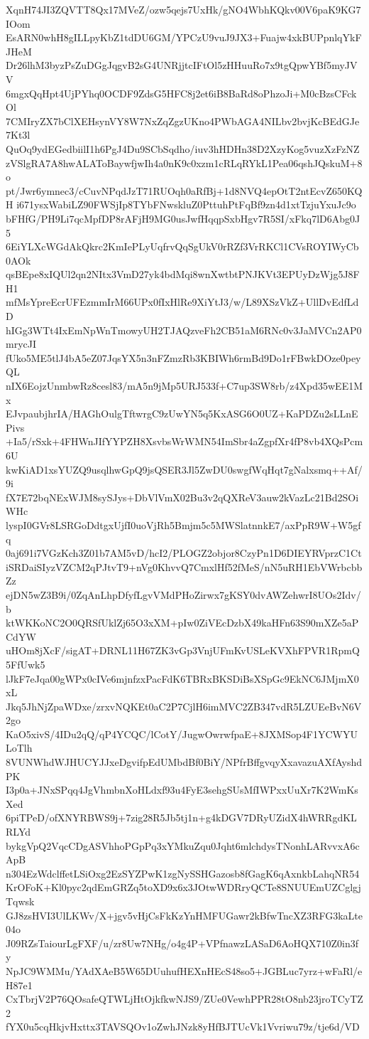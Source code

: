 XqnH74JI3ZQVTT8Qx17MVeZ/ozw5qejs7UxHk/gNO4WbhKQkv00V6paK9KG7IOom
EsARN0whH8gILLpyKbZ1tdDU6GM/YPCzU9vuJ9JX3+Fuajw4xkBUPpnlqYkFJHeM
Dr26lhM3byzPsZuDGgJqgvB2sG4UNRjjtcIFtOl5zHHuuRo7x9tgQpwYBf5myJVV
6mgxQqHpt4UjPYhq0OCDF9ZdsG5HFC8j2et6iB8BaRd8oPhzoJi+M0cBzsCFckOl
7CMIryZX7bClXEHsynVY8W7NxZqZgzUKno4PWbAGA4NILbv2bvjKcBEdGJe7Kt3l
QuOq9ydEGedbiilI1h6PgJ4Du9SCbSqdho/iuv3hHDHn38D2XzyKog5vuzXzFzNZ
zVSlgRA7A8hwALAToBaywfjwIh4a0nK9c0xzm1cRLqRYkL1Pea06qshJQskuM+8o
pt/Jwr6ymnec3/cCuvNPqdJzT71RUOqh0aRfBj+1d8NVQ4epOtT2ntEcvZ650KQH
i671ysxWabiLZ90FWSjIp8TYbFNwskluZ0PttuhPtFqBf9zn4d1xtTzjuYxuJc9o
bFHfG/PH9Li7qcMpfDP8rAFjH9MG0usJwfHqqpSxbHgv7R5SI/xFkq7lD6Abg0J5
6EiYLXcWGdAkQkrc2KmIePLyUqfrvQqSgUkV0rRZf3VrRKCl1CVsROYIWyCb0AOk
qsBEpe8xIQUl2qn2NItx3VmD27yk4bdMqi8wnXwtbtPNJKVt3EPUyDzWjg5J8FH1
mfMsYpreEcrUFEzmmIrM66UPx0fIxHlRe9XiYtJ3/w/L89XSzVkZ+UllDvEdfLdD
hIGg3WTt4IxEmNpWnTmowyUH2TJAQzveFh2CB51aM6RNc0v3JaMVCn2AP0mrycJI
fUko5ME5tlJ4bA5eZ07JqsYX5n3nFZmzRb3KBIWh6rmBd9Do1rFBwkDOze0peyQL
nIX6EojzUnmbwRz8cesl83/mA5n9jMp5URJ533f+C7up3SW8rb/z4Xpd35wEE1Mx
EJvpaubjhrIA/HAGhOulgTftwrgC9zUwYN5q5KxASG6O0UZ+KaPDZu2sLLnEPivs
+Ia5/rSxk+4FHWnJIfYYPZH8XsvbsWrWMN54ImSbr4aZgpfXr4fP8vb4XQsPcm6U
kwKiAD1xsYUZQ9usqlhwGpQ9jsQSER3Jl5ZwDU0swgfWqHqt7gNalxsmq++Af/9i
fX7E72bqNExWJM8sySJys+DbVlVmX02Bu3v2qQXReV3auw2kVazLc21Bd2SOiWHc
lyspI0GVr8LSRGoDdtgxUjfI0uoVjRh5Bmjm5c5MWSlatnnkE7/axPpR9W+W5gfq
0aj691i7VGzKch3Z01b7AM5vD/hcI2/PLOGZ2objor8CzyPn1D6DIEYRVprzC1Ct
iSRDaiSIyzVZCM2qPJtvT9+nVg0KhvvQ7CmxlHf52fMeS/nN5uRH1EbVWrbcbbZz
ejDN5wZ3B9i/0ZqAnLhpDfyfLgvVMdPHoZirwx7gKSY0dvAWZehwrI8UOs2Idv/b
ktWKKoNC2O0QRSfUklZj65O3xXM+pIw0ZiVEcDzbX49kaHFn63S90mXZe5aPCdYW
uHOm8jXcF/sigAT+DRNL11H67ZK3vGp3VnjUFmKvUSLeKVXhFPVR1RpmQ5FfUwk5
lJkF7eJqa00gWPx0cIVe6mjnfzxPacFdK6TBRxBKSDiBsXSpGc9EkNC6JMjmX0xL
Jkq5JhNjZpaWDxe/zrxvNQKEt0aC2P7CjlH6imMVC2ZB347vdR5LZUEeBvN6V2go
KaO5xivS/4IDu2qQ/qP4YCQC/lCotY/JugwOwrwfpaE+8JXMSop4F1YCWYULoTlh
8VUNWhdWJHUCYJJxeDgvifpEdUMbdBf0BiY/NPfrBffgvqyXxavazuAXfAyshdPK
I3p0a+JNxSPqq4JgVhmbnXoHLdxf93u4FyE3sehgSUsMfIWPxxUuXr7K2WmKsXed
6piTPeD/ofXNYRBWS9j+7zig28R5Jb5tj1n+g4kDGV7DRyUZidX4hWRRgdKLRLYd
bykgVpQ2VqcCDgASVhhoPGpPq3xYMkuZqu0Jqht6mlchdysTNonhLARvvxA6cApB
n304EzWdclffetLSiOxg2EzSYZPwK1zgNySSHGazosb8fGagK6qAxnkbLahqNR54
KrOFoK+Kl0pyc2qdEmGRZq5toXD9x6x3JOtwWDRryQCTe8SNUUEmUZCglgjTqwsk
GJ8zsHVI3UlLKWv/X+jgv5vHjCsFkKzYnHMFUGawr2kBfwTncXZ3RFG3kaLte04o
J09RZsTaiourLgFXF/u/zr8Uw7NHg/o4g4P+VPfnawzLASaD6AoHQX710Z0in3fy
NpJC9WMMu/YAdXAeB5W65DUuhufHEXnHEcS48so5+JGBLuc7yrz+wFaRl/eH87e1
CxTbrjV2P76QOsafeQTWLjHtOjkfkwNJS9/ZUe0VewhPPR28tO8nb23jroTCyTZ2
fYX0u5cqHkjvHxttx3TAVSQOv1oZwhJNzk8yHfBJTUcVk1Vvriwu79z/tje6d/VD
